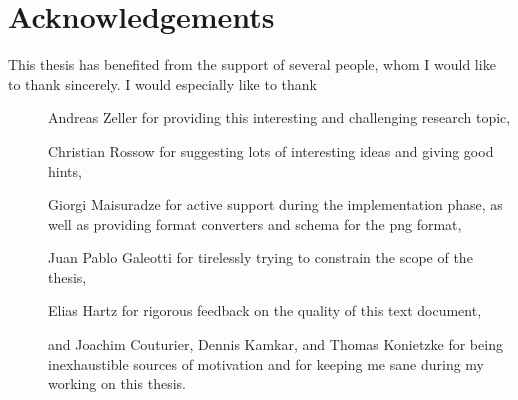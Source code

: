 \section*{Acknowledgements}
This thesis has benefited from the support of several people, whom I would like to thank sincerely.
I would especially like to thank
\begin{description}
	\item[] Andreas Zeller for providing this interesting and challenging research topic,
	\item[] Christian Rossow for suggesting lots of interesting ideas and giving good hints,
	\item[] Giorgi Maisuradze for active support during the implementation phase, as well as providing format
	converters and schema for the png format,
	\item[] Juan Pablo Galeotti for tirelessly trying to constrain the scope of the thesis,
 	\item[] Elias Hartz for rigorous feedback on the quality of this text document,
	\item[] and Joachim Couturier, Dennis Kamkar, and Thomas Konietzke for being inexhaustible sources
	of motivation and for keeping me sane during my working on this thesis.
\end{description}